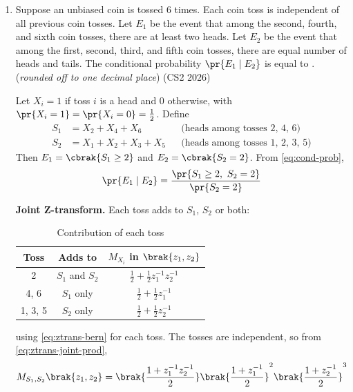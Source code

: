 \begin{enumerate}[label=\thesubsection.\arabic*, ref=\thesubsection.\theenumi]
The following code verifies the solution with a random matrix.
\begin{lstlisting}
codes/det.py
\end{lstlisting}

\item Suppose an unbiased coin is tossed 6 times. Each coin toss is
independent of all previous coin tosses. Let $E_1$ be the event that among
the second, fourth, and sixth coin tosses, there are at least two heads.
Let $E_2$ be the event that among the first, second, third, and fifth coin
tosses, there are equal number of heads and tails. The conditional
probability $\pr{E_1 \mid E_2}$ is equal to \underline{\hspace{1.5cm}}.
(\textit{rounded off to one decimal place})
\hfill (CS2 2026)

\solution Let $X_i = 1$ if toss $i$ is a head and $0$ otherwise, with
$\pr{X_i = 1} = \pr{X_i = 0} = \frac{1}{2}$. Define
\begin{align}
S_1 &= X_2 + X_4 + X_6 && \text{(heads among tosses 2, 4, 6)} \\
S_2 &= X_1 + X_2 + X_3 + X_5 && \text{(heads among tosses 1, 2, 3, 5)}
\end{align}
Then $E_1 = \cbrak{S_1 \ge 2}$ and $E_2 = \cbrak{S_2 = 2}$. From
\eqref{eq:cond-prob},
\begin{align}
\pr{E_1 \mid E_2} = \frac{\pr{S_1 \ge 2,\ S_2 = 2}}{\pr{S_2 = 2}}
\label{eq:q63-cond}
\end{align}

\textbf{Joint Z-transform.} Each toss adds to $S_1$, $S_2$ or both:
\begin{table}[H]
\centering
\renewcommand{\arraystretch}{1.5}
\begin{tabular}{|c|c|c|}
\hline
\textbf{Toss} & \textbf{Adds to} & $M_{X_i}$ \textbf{in} $\brak{z_1, z_2}$ \\
\hline
2 & $S_1$ and $S_2$ & $\frac{1}{2} + \frac{1}{2} z_1^{-1} z_2^{-1}$ \\
4, 6 & $S_1$ only & $\frac{1}{2} + \frac{1}{2} z_1^{-1}$ \\
1, 3, 5 & $S_2$ only & $\frac{1}{2} + \frac{1}{2} z_2^{-1}$ \\
\hline
\end{tabular}
\caption{Contribution of each toss}
\label{tab:q63-tosses}
\end{table}
using \eqref{eq:ztrans-bern} for each toss. The tosses are independent, so
from \eqref{eq:ztrans-joint-prod},
\begin{align}
M_{S_1,S_2}\brak{z_1, z_2}
= \brak{\frac{1 + z_1^{-1} z_2^{-1}}{2}}
\brak{\frac{1 + z_1^{-1}}{2}}^{2}
\brak{\frac{1 + z_2^{-1}}{2}}^{3}
\label{eq:q63-M}
\end{align}


\end{enumerate}
